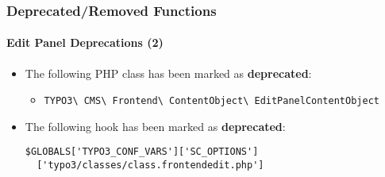 %

\begin{frame}[fragile]
	\frametitle{Deprecated/Removed Functions}
	\framesubtitle{Edit Panel Deprecations (2)}


	\begin{itemize}
		\item The following PHP class has been marked as \textbf{deprecated}:
			\begin{itemize}\smaller
				\item \texttt{TYPO3\textbackslash
					CMS\textbackslash
					Frontend\textbackslash
					ContentObject\textbackslash
					EditPanelContentObject}
			\end{itemize}\normalsize
		\item The following hook has been marked as \textbf{deprecated}:
\begin{lstlisting}
$GLOBALS['TYPO3_CONF_VARS']['SC_OPTIONS']
  ['typo3/classes/class.frontendedit.php']
\end{lstlisting}

	\end{itemize}

\end{frame}

